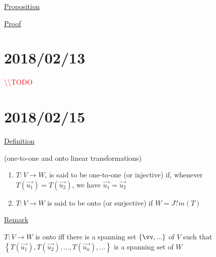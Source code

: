 \documentclass[12pt]{article}
\renewcommand{\v}[1]{\overrightarrow{#1}}
\newenvironment{block}[1][Label]{\underline{#1}\par}{}
\newenvironment{proof}{\block[Proof]}{\endblock}
\newenvironment{proposition}{\block[Proposition]}{\endblock}
\newcommand{\todo}[0]{\textcolor{red}{\textbackslash\textbackslash TODO \ }}
\newcommand{\bb}[1]{\left\{#1\right\}}
\begin{document}
\begin{proposition}
\begin{enumerate}
\begin{proof}
\begin{enumerate}
			\end{enumerate}
			
		\end{proof}
	\end{enumerate}
\end{proposition}

\section{2018/02/13}

\todo

\section{2018/02/15}

\begin{block}[Definition]
	(one-to-one and onto linear transformations)
	
	\begin{enumerate}
		\item $T: V \rightarrow W$, is said to be one-to-one (or injective) if, whenever $T(\v{u_1}) = T(\v{u_2})$, we have $\v{u_1} = \v{u_2}$
		\item $T: V \rightarrow W$ is said to be onto (or surjective) if $W = J?m(T)$
	\end{enumerate}
\end{block}

\begin{block}[Remark]
	$T: V \rightarrow W$ is onto iff there is a spanning set $\bb{\vv, ...}$ of $V$ such that $\bb{T(\v{u_1}), T(\v{u_2}), ..., T(\v{u_n}), ...}$ is a spanning set of $W$
\end{block}
\end{document}
